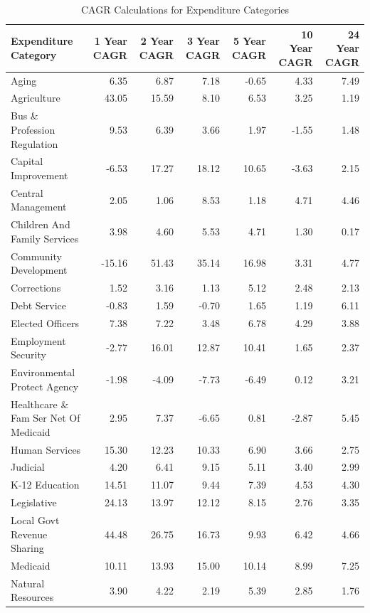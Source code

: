 \documentclass[
  letterpaper,
  DIV=11,
  numbers=noendperiod]{scrreport}
\begin{document}
\begin{table}

\caption{CAGR Calculations for Expenditure Categories}
\centering
\begin{tabular}[t]{l|r|r|r|r|r|r}
\hline
Expenditure Category & 1 Year CAGR & 2 Year CAGR & 3 Year CAGR & 5 Year CAGR & 10 Year CAGR & 24 Year CAGR\\
\hline
Aging & 6.35 & 6.87 & 7.18 & -0.65 & 4.33 & 7.49\\
\hline
Agriculture & 43.05 & 15.59 & 8.10 & 6.53 & 3.25 & 1.19\\
\hline
Bus \& Profession Regulation & 9.53 & 6.39 & 3.66 & 1.97 & -1.55 & 1.48\\
\hline
Capital Improvement & -6.53 & 17.27 & 18.12 & 10.65 & -3.63 & 2.15\\
\hline
Central Management & 2.05 & 1.06 & 8.53 & 1.18 & 4.71 & 4.46\\
\hline
Children And Family Services & 3.98 & 4.60 & 5.53 & 4.71 & 1.30 & 0.17\\
\hline
Community Development & -15.16 & 51.43 & 35.14 & 16.98 & 3.31 & 4.77\\
\hline
Corrections & 1.52 & 3.16 & 1.13 & 5.12 & 2.48 & 2.13\\
\hline
Debt Service & -0.83 & 1.59 & -0.70 & 1.65 & 1.19 & 6.11\\
\hline
Elected Officers & 7.38 & 7.22 & 3.48 & 6.78 & 4.29 & 3.88\\
\hline
Employment Security & -2.77 & 16.01 & 12.87 & 10.41 & 1.65 & 2.37\\
\hline
Environmental Protect Agency & -1.98 & -4.09 & -7.73 & -6.49 & 0.12 & 3.21\\
\hline
Healthcare \& Fam Ser Net Of Medicaid & 2.95 & 7.37 & -6.65 & 0.81 & -2.87 & 5.45\\
\hline
Human Services & 15.30 & 12.23 & 10.33 & 6.90 & 3.66 & 2.75\\
\hline
Judicial & 4.20 & 6.41 & 9.15 & 5.11 & 3.40 & 2.99\\
\hline
K-12 Education & 14.51 & 11.07 & 9.44 & 7.39 & 4.53 & 4.30\\
\hline
Legislative & 24.13 & 13.97 & 12.12 & 8.15 & 2.76 & 3.35\\
\hline
Local Govt Revenue Sharing & 44.48 & 26.75 & 16.73 & 9.93 & 6.42 & 4.66\\
\hline
Medicaid & 10.11 & 13.93 & 15.00 & 10.14 & 8.99 & 7.25\\
\hline
Natural Resources & 3.90 & 4.22 & 2.19 & 5.39 & 2.85 & 1.76\\

\end{tabular}
\end{table}
\end{document}

